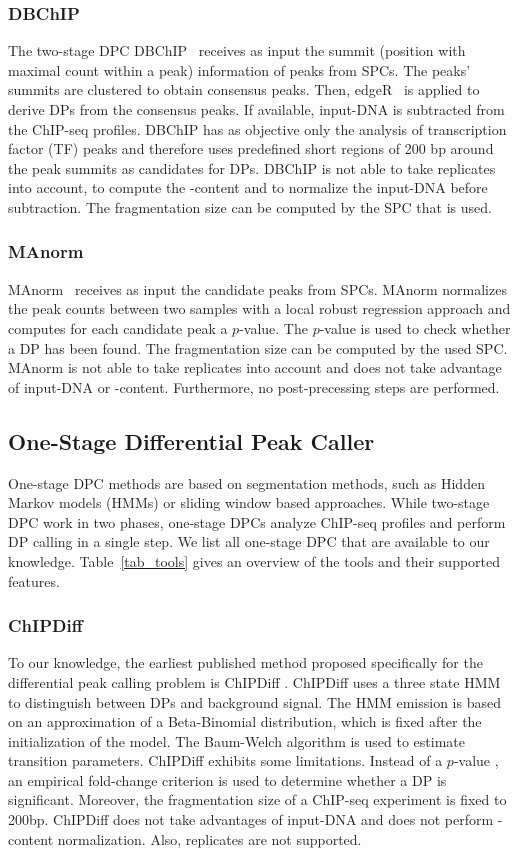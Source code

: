 \subsubsection{DBChIP}
The two-stage DPC DBChIP~\citep{liang2012} receives as input the summit (position with maximal count within a peak) information of peaks from SPCs.
The peaks' summits are clustered to obtain consensus peaks.
Then, edgeR~\citep{robinson2010} is applied to derive DPs from the consensus peaks.
If available, input-DNA is subtracted from the ChIP-seq profiles.
DBChIP has as objective only the analysis of transcription factor (TF) peaks and therefore uses predefined short regions of 200 bp around the peak summits as candidates for DPs. 
DBChIP is not able to take replicates into account, to compute the -content and to normalize the input-DNA before subtraction.
The fragmentation size can be computed by the SPC that is used.

\subsubsection{MAnorm}
MAnorm~\citep{shao2012} receives as input the candidate peaks from SPCs.
MAnorm normalizes the peak counts between two samples with a local robust regression approach and computes for each candidate peak a $p$-value.
The $p$-value is used to check whether a DP has been found.
The fragmentation size can be computed by the used SPC.
MAnorm is not able to take replicates into account and does not take advantage of input-DNA or -content.
Furthermore, no post-precessing steps are performed.

\subsection{One-Stage Differential Peak Caller}
One-stage DPC methods are based on segmentation methods, such as Hidden Markov models (HMMs) or sliding window based approaches. 
While two-stage DPC work in two phases, one-stage DPCs analyze ChIP-seq profiles and perform DP calling in a single step.
We list all one-stage DPC that are available to our knowledge.
Table~\ref{tab_tools} gives an overview of the tools and their supported features.

\subsubsection{ChIPDiff}
To our knowledge, the earliest published method proposed specifically for the differential peak calling problem is ChIPDiff \citep{xu2008}. 
ChIPDiff uses a three state HMM to distinguish between DPs and background signal.
The HMM emission is based on an approximation of a Beta-Binomial distribution, which is fixed after the initialization of the model. 
The Baum-Welch algorithm is used to estimate transition parameters. 
ChIPDiff exhibits some limitations.
Instead of a $p$-value , an empirical fold-change criterion is used to determine whether a DP is significant. 
Moreover, the fragmentation size of a ChIP-seq experiment is fixed to 200bp.
ChIPDiff does not take advantages of input-DNA and does not perform -content normalization.
Also, replicates are not supported.


